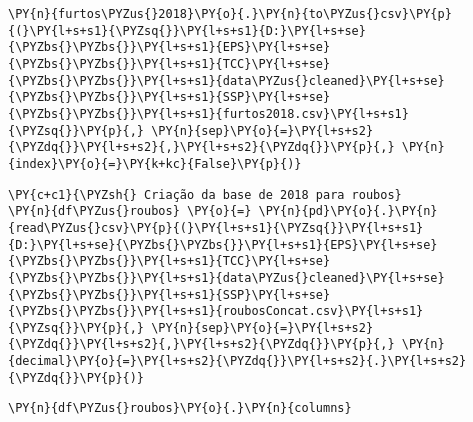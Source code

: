     \begin{tcolorbox}[breakable, size=fbox, boxrule=1pt, pad at break*=1mm,colback=cellbackground, colframe=cellborder]
\begin{Verbatim}[commandchars=\\\{\}]
\PY{n}{furtos\PYZus{}2018}\PY{o}{.}\PY{n}{to\PYZus{}csv}\PY{p}{(}\PY{l+s+s1}{\PYZsq{}}\PY{l+s+s1}{D:}\PY{l+s+se}{\PYZbs{}\PYZbs{}}\PY{l+s+s1}{EPS}\PY{l+s+se}{\PYZbs{}\PYZbs{}}\PY{l+s+s1}{TCC}\PY{l+s+se}{\PYZbs{}\PYZbs{}}\PY{l+s+s1}{data\PYZus{}cleaned}\PY{l+s+se}{\PYZbs{}\PYZbs{}}\PY{l+s+s1}{SSP}\PY{l+s+se}{\PYZbs{}\PYZbs{}}\PY{l+s+s1}{furtos2018.csv}\PY{l+s+s1}{\PYZsq{}}\PY{p}{,} \PY{n}{sep}\PY{o}{=}\PY{l+s+s2}{\PYZdq{}}\PY{l+s+s2}{,}\PY{l+s+s2}{\PYZdq{}}\PY{p}{,} \PY{n}{index}\PY{o}{=}\PY{k+kc}{False}\PY{p}{)}
\end{Verbatim}
\end{tcolorbox}


    \begin{tcolorbox}[breakable, size=fbox, boxrule=1pt, pad at break*=1mm,colback=cellbackground, colframe=cellborder]
\begin{Verbatim}[commandchars=\\\{\}]
\PY{c+c1}{\PYZsh{} Criação da base de 2018 para roubos}
\PY{n}{df\PYZus{}roubos} \PY{o}{=} \PY{n}{pd}\PY{o}{.}\PY{n}{read\PYZus{}csv}\PY{p}{(}\PY{l+s+s1}{\PYZsq{}}\PY{l+s+s1}{D:}\PY{l+s+se}{\PYZbs{}\PYZbs{}}\PY{l+s+s1}{EPS}\PY{l+s+se}{\PYZbs{}\PYZbs{}}\PY{l+s+s1}{TCC}\PY{l+s+se}{\PYZbs{}\PYZbs{}}\PY{l+s+s1}{data\PYZus{}cleaned}\PY{l+s+se}{\PYZbs{}\PYZbs{}}\PY{l+s+s1}{SSP}\PY{l+s+se}{\PYZbs{}\PYZbs{}}\PY{l+s+s1}{roubosConcat.csv}\PY{l+s+s1}{\PYZsq{}}\PY{p}{,} \PY{n}{sep}\PY{o}{=}\PY{l+s+s2}{\PYZdq{}}\PY{l+s+s2}{,}\PY{l+s+s2}{\PYZdq{}}\PY{p}{,} \PY{n}{decimal}\PY{o}{=}\PY{l+s+s2}{\PYZdq{}}\PY{l+s+s2}{.}\PY{l+s+s2}{\PYZdq{}}\PY{p}{)}
\end{Verbatim}
\end{tcolorbox}

    \begin{tcolorbox}[breakable, size=fbox, boxrule=1pt, pad at break*=1mm,colback=cellbackground, colframe=cellborder]
\begin{Verbatim}[commandchars=\\\{\}]
\PY{n}{df\PYZus{}roubos}\PY{o}{.}\PY{n}{columns}
\end{Verbatim}
\end{tcolorbox}

